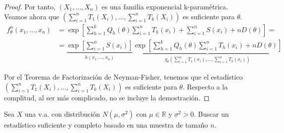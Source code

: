 \begin{teo}
\begin{proof}
        Por tanto, $(X_1, \ldots, X_n)$ es una familia exponencial k-paramétrica. Veamos ahora que $\left(\sum\limits_{i=1}^n T_1(X_i), \ldots, \sum\limits_{i=1}^n T_k(X_i)\right)$ es suficiente para $\theta$.
        \begin{align*}
            f_\theta^n(x_1, \ldots, x_n) &= \exp\left[\sum\limits_{h=1}^k Q_h(\theta) \sum\limits_{i=1}^n T_h(x_i) + \sum\limits_{i=1}^n S(x_i) + n D(\theta)\right] =\\&= \underbrace{\exp\left[\sum\limits_{i=1}^n S(x_i)\right]}_{h(x_1, \ldots, x_n)} \underbrace{\exp\left[\sum\limits_{h=1}^k Q_h(\theta) \sum\limits_{i=1}^n T_h(x_i) + n D(\theta)\right]}_{g_\theta\left(\sum\limits_{i=1}^n T_1(x_i), \ldots, \sum\limits_{i=1}^n T_k(x_i)\right)}
        \end{align*}
        
        Por el Teorema de Factorización de Neyman-Fisher, tenemos que el estadístico $\left(\sum\limits_{i=1}^n T_1(X_i), \ldots, \sum\limits_{i=1}^n T_k(X_i)\right)$ es suficiente para $\theta$. Respecto a la complitud, al ser más complicado, no se incluye la demostración.
    \end{proof}
\end{teo}

\begin{ejemplo}
    Sea $X$ una v.a. con distribución $N(\mu, \sigma^2)$ con $\mu \in \mathbb{R}$ y $\sigma^2 > 0$. Buscar un estadístico suficiente y completo basado en una muestra de tamaño $n$.
\end{ejemplo}